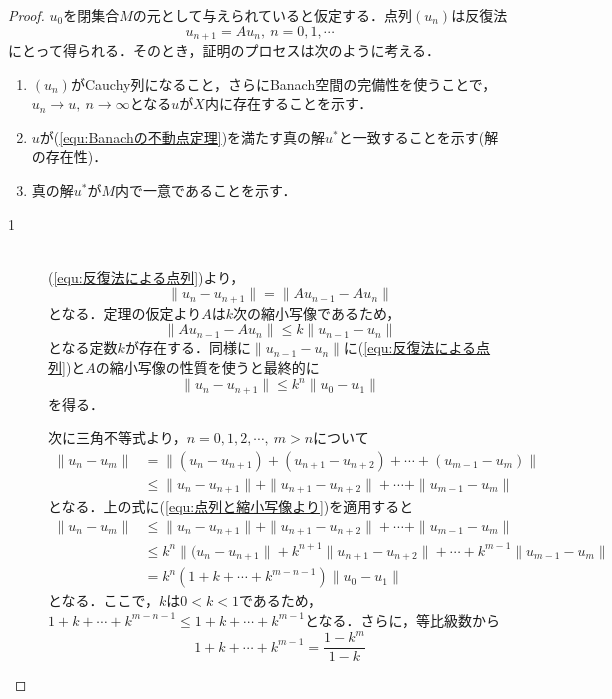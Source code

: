 \documentclass[11pt,a4paper]{jsarticle}
\theoremstyle{definition}
\begin{document}
\begin{proof}
  $u_0$を閉集合$M$の元として与えられていると仮定する．点列$(u_n)$は反復法
  \begin{equation}
    \label{equ:反復法による点列}
    u_{n+1}=Au_n,\ n=0,1,\cdots
  \end{equation}
  にとって得られる．そのとき，証明のプロセスは次のように考える．
  \begin{enumerate}
    \item $(u_n)$がCauchy列になること，さらにBanach空間の完備性を使うことで，$u_n\rightarrow u,\ n\rightarrow \infty$となる$u$が$X$内に存在することを示す．
    \item $u$が(\ref{equ:Banachの不動点定理})を満たす真の解$u^*$と一致することを示す(解の存在性)．
    \item 真の解$u^*$が$M$内で一意であることを示す．
  \end{enumerate}

  \begin{description}
    \item[1]
      \quad\\
      (\ref{equ:反復法による点列})より，
      \begin{equation}
        \|u_n-u_{n+1}\|=\|Au_{n-1}-Au_{n}\|
      \end{equation}
      となる．定理の仮定より$A$は$k$次の縮小写像であるため，
      \begin{equation}
        \|Au_{n-1}-Au_{n}\|\leq k\|u_{n-1}-u_{n}\|
      \end{equation}
      となる定数$k$が存在する．同様に$\|u_{n-1}-u_{n}\|$に(\ref{equ:反復法による点列})と$A$の縮小写像の性質を使うと最終的に
      \begin{equation}
        \label{equ:点列と縮小写像より}
        \|u_{n}-u_{n+1}\|\leq k^n\|u_{0}-u_{1}\|
      \end{equation}
      を得る．

      次に三角不等式より，$n=0,1,2,\cdots,\ m>n$について
      \begin{align}
        \|u_{n}-u_{m}\| & = \|(u_{n}-u_{n+1})+(u_{n+1}-u_{n+2})+\cdots+(u_{m-1}-u_{m})\|      \\
                        & \leq \|u_{n}-u_{n+1}\|+\|u_{n+1}-u_{n+2}\|+\cdots+\|u_{m-1}-u_{m}\|
      \end{align}
      となる．上の式に(\ref{equ:点列と縮小写像より})を適用すると
      \begin{align}
        \|u_{n}-u_{m}\| & \leq \|u_{n}-u_{n+1}\|+\|u_{n+1}-u_{n+2}\|+\cdots+\|u_{m-1}-u_{m}\| \label{equ:-1}    \\
                        & \leq k^n\|(u_{n}-u_{n+1}\|+k^{n+1}\|u_{n+1}-u_{n+2}\|+\cdots+k^{m-1}\|u_{m-1}-u_{m}\| \\
                        & = k^n(1+k+\cdots+k^{m-n-1})\|u_0-u_1\|
      \end{align}
      となる．ここで，$k$は$0<k<1$であるため，$1+k+\cdots+k^{m-n-1}\leq 1+k+\cdots+k^{m-1}$となる．さらに，等比級数から
      \begin{equation}
        1+k+\cdots+k^{m-1} = \frac{1-k^m}{1-k}
      \end{equation}


\end{description}
\end{proof}
\end{document}

